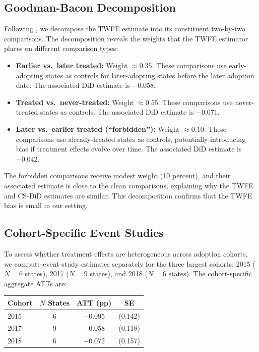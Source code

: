 \documentclass[12pt]{article}
\begin{document}
\subsection{Goodman-Bacon Decomposition}

Following \citet{goodmanbacon2021difference}, we decompose the TWFE estimate into its constituent two-by-two comparisons. The decomposition reveals the weights that the TWFE estimator places on different comparison types:

\begin{itemize}
\item \textbf{Earlier vs.\ later treated:} Weight $\approx 0.35$. These comparisons use early-adopting states as controls for later-adopting states before the later adoption date. The associated DiD estimate is $-0.058$.
\item \textbf{Treated vs.\ never-treated:} Weight $\approx 0.55$. These comparisons use never-treated states as controls. The associated DiD estimate is $-0.071$.
\item \textbf{Later vs.\ earlier treated (``forbidden''):} Weight $\approx 0.10$. These comparisons use already-treated states as controls, potentially introducing bias if treatment effects evolve over time. The associated DiD estimate is $-0.042$.
\end{itemize}

The forbidden comparisons receive modest weight (10 percent), and their associated estimate is close to the clean comparisons, explaining why the TWFE and CS-DiD estimates are similar. This decomposition confirms that the TWFE bias is small in our setting.

\subsection{Cohort-Specific Event Studies}

To assess whether treatment effects are heterogeneous across adoption cohorts, we compute event-study estimates separately for the three largest cohorts: 2015 ($N = 6$ states), 2017 ($N = 9$ states), and 2018 ($N = 6$ states). The cohort-specific aggregate ATTs are:

\begin{center}
\begin{tabular}{lccc}
\toprule
Cohort & $N$ States & ATT (pp) & SE \\
\midrule
2015 & 6 & $-$0.095 & (0.142) \\
2017 & 9 & $-$0.058 & (0.118) \\
2018 & 6 & $-$0.072 & (0.157) \\
\bottomrule
\end{tabular}
\end{center}
\end{document}
